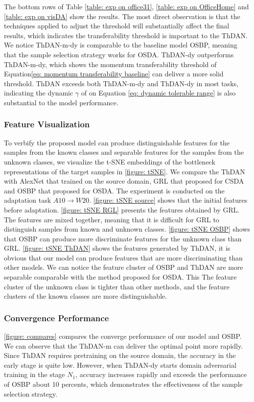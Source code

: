 The bottom rows of Table \ref{table: exp on office31}, \ref{table: exp on OfficeHome} and \ref{table: exp on visDA} show the results.
The most direct observation is that the techniques applied to adjust the threshold will substantially affect the final results, which indicates the transferability threshold is important to the ThDAN.
We notice ThDAN-m-dy is comparable to the baseline model OSBP, meaning that the sample selection strategy works for OSDA. 
ThDAN-dy outperforms ThDAN-m-dy, which shows the momentum transferability threshold of Equation\ref{eq: momentum transferability baseline} can deliver a more solid threshold. 
ThDAN exceeds both ThDAN-m-dy and ThDAN-dy in most tasks, indicating the dynamic $\gamma$ of on Equation \ref{eq: dynamic tolerable range} is also substantial to the model performance.


\subsubsection{Feature Visualization}
To verbify the proposed model can produce distinguishable features for the samples from the known classes and separable features for the samples from the unknown classes, we visualize the t-SNE embeddings of the bottleneck representations of the target samples in \figurename{\ref{figure: tSNE}}.
We compare the ThDAN with AlexNet that trained on the source domain, GRL that proposed for CSDA and OSBP that proposed for OSDA. 
The experiment is conducted on the adaptation task \textbf{$A10\to W20 $}.
\figurename{\ref{figure: tSNE source}} shows that the initial features before adaptation. 
\figurename{\ref{figure: tSNE RGL}} presents the features obtained by GRL. 
The features are mixed together, meaning that it is difficult for GRL to distinguish samples from known and unknown classes. 
\figurename{\ref{figure: tSNE OSBP}} shows that OSBP can produce more discriminate features for the unknown class than GRL. 
\figurename{\ref{figure: tSNE ThDAN}} shows the features generated by ThDAN, it is obvious that our model can produce features that are more discriminating than other models. 
We can notice the feature cluster of OSBP and ThDAN are more separable comparable with the method proposed for OSDA. 
This 
The feature cluster of the unknown class is tighter than other methods, and the feature clusters of the known classes are more distinguishable. 


\subsubsection{Convergence Performance}
\figurename{\ref{figure: compares}} compares the converge performance of our model and OSBP. 
We can observe that the ThDAN-m can deliver the optimal point more rapidly. 
Since ThDAN requires pretraining on the source domain, the accuracy in the early stage is quite low. 
However, when ThDAN-dy starts domain adversarial training in the stage $N_1$, accuracy increases rapidly and exceeds the performance of OSBP about 10 percents, which demonstrates the effectiveness of the sample selection strategy. 

